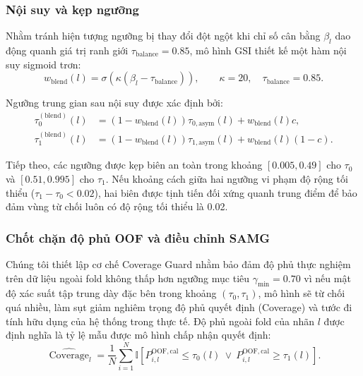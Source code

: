 \documentclass[11pt,a4paper]{article}
\begin{document}
\subsubsection{Nội suy và kẹp ngưỡng}
Nhằm tránh hiện tượng ngưỡng bị thay đổi đột ngột khi chỉ số cân bằng \(\beta_l\) dao động quanh giá trị ranh giới \(\tau_{\mathrm{balance}} = 0.85\), mô hình GSI thiết kế một hàm nội suy sigmoid trơn:
\begin{equation}
w_{\mathrm{blend}}(l) = \sigma\left(\kappa(\beta_l - \tau_{\mathrm{balance}})\right), \qquad \kappa = 20, \quad \tau_{\mathrm{balance}} = 0.85.
\label{eq:blend-weight}
\end{equation}

Ngưỡng trung gian sau nội suy được xác định bởi:
\begin{align}
\tau_0^{(\mathrm{blend})}(l) &= (1 - w_{\mathrm{blend}}(l))\tau_{0,\mathrm{asym}}(l) + w_{\mathrm{blend}}(l)c, \label{eq:blend-0} \\
\tau_1^{(\mathrm{blend})}(l) &= (1 - w_{\mathrm{blend}}(l))\tau_{1,\mathrm{asym}}(l) + w_{\mathrm{blend}}(l)(1-c). \label{eq:blend-1}
\end{align}

Tiếp theo, các ngưỡng được kẹp biên an toàn trong khoảng \([0.005, 0.49]\) cho \(\tau_0\) và \([0.51, 0.995]\) cho \(\tau_1\). Nếu khoảng cách giữa hai ngưỡng vi phạm độ rộng tối thiểu (\(\tau_1 - \tau_0 < 0.02\)), hai biên được tịnh tiến đối xứng quanh trung điểm để bảo đảm vùng từ chối luôn có độ rộng tối thiểu là 0.02.

\subsubsection{Chốt chặn độ phủ OOF và điều chỉnh SAMG}
Chúng tôi thiết lập cơ chế Coverage Guard nhằm bảo đảm độ phủ thực nghiệm trên dữ liệu ngoài fold không thấp hơn ngưỡng mục tiêu \(\gamma_{\min} = 0.70\) vì nếu mật độ xác suất tập trung dày đặc bên trong khoảng \((\tau_0, \tau_1)\), mô hình sẽ từ chối quá nhiều, làm sụt giảm nghiêm trọng độ phủ quyết định (Coverage) và tước đi tính hữu dụng của hệ thống trong thực tế. Độ phủ ngoài fold của nhãn \(l\) được định nghĩa là tỷ lệ mẫu được mô hình chấp nhận quyết định:
\begin{equation}
\widehat{\operatorname{Coverage}}_l = \frac{1}{N}\sum_{i=1}^{N}\mathbb I\left[P^{\mathrm{OOF,cal}}_{i,l} \le \tau_0(l) \ \lor\ P^{\mathrm{OOF,cal}}_{i,l} \ge \tau_1(l)\right].
\label{eq:emp-cov}
\end{equation}
\end{document}
